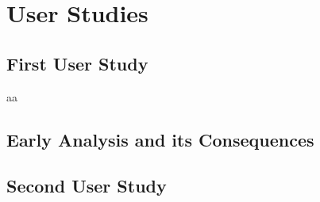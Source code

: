 \chapter{User Studies}\label{chapter:userstudy}

\section{First User Study}
aa

\section{Early Analysis and its Consequences}

\section{Second User Study}